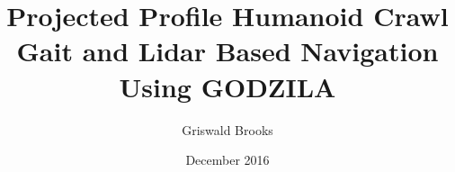
%


%


%
\graphicspath{{./pictures/}}


\renewcommand{\baselinestretch}{1.6}
\newtheorem{theorem}{Theorem}[chapter]
\newcommand{\btheorem}{\begin{theorem}\rm}
\newcommand{\etheorem}{$\diamond$\end{theorem}}
\newtheorem{definition}{Definition}[chapter]
\newcommand{\bdefn}{\begin{definition}\rm}
\newcommand{\edefn}{\end{definition}}
\newtheorem{lemma}{Lemma}[chapter]
\newtheorem{remark}{Remark}[chapter]
\newcommand{\bremark}{\begin{remark}\rm}
\newcommand{\eremark}{\end{remark}}
\newtheorem{example}{Example}[chapter]
\newcommand{\bexample}{\begin{example}\rm}
\newcommand{\eexample}{\end{example}}
\newtheorem{assumption}{Assumption}[chapter]
\newcommand{\bassump}{\begin{assumption}\rm}
\newcommand{\eassump}{\end{assumption}}


\title{Projected Profile Humanoid Crawl Gait and Lidar Based Navigation Using GODZILA}
\author{Griswald Brooks}
\date{December 2016}

\mstitlepage

